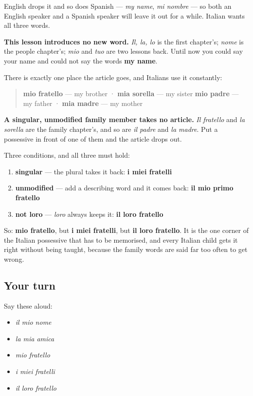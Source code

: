 English drops it and so does Spanish — \emph{my name}, \emph{mi nombre} — so both an English speaker and a Spanish speaker will leave it out for a while. Italian wants all three words.

\textbf{This lesson introduces no new word.} \emph{Il, la, lo} is the first chapter's; \emph{nome} is the people chapter's; \emph{mio} and \emph{tuo} are two lessons back. Until now you could say your name and could not say the words \textbf{my name}.

\begin{grammarlens}[title={Grammar lens: the exception, one family and no article}]
There is exactly one place the article goes, and Italians use it constantly:

\begin{quote}
\textbf{mio fratello} — my brother · \textbf{mia sorella} — my sister \textbf{mio padre} — my father · \textbf{mia madre} — my mother
\end{quote}

\textbf{A singular, unmodified family member takes no article.} \emph{Il fratello} and \emph{la sorella} are the family chapter's, and so are \emph{il padre} and \emph{la madre}. Put a possessive in front of one of them and the article drops out.

Three conditions, and all three must hold:

\begin{enumerate}
\raggedright
  \item \textbf{singular} — the plural takes it back: \textbf{i miei fratelli}
  \item \textbf{unmodified} — add a describing word and it comes back: \textbf{il mio primo fratello}
  \item \textbf{not loro} — \emph{loro} always keeps it: \textbf{il loro fratello}
\end{enumerate}

So: \textbf{mio fratello}, but \textbf{i miei fratelli}, but \textbf{il loro fratello}. It is the one corner of the Italian possessive that has to be memorised, and every Italian child gets it right without being taught, because the family words are said far too often to get wrong.
\end{grammarlens}

\subsection*{Your turn}
Say these aloud:

\begin{itemize}
\raggedright
  \item \emph{il mio nome}
  \item \emph{la mia amica}
  \item \emph{mio fratello}
  \item \emph{i miei fratelli}
  \item \emph{il loro fratello}
\end{itemize}

